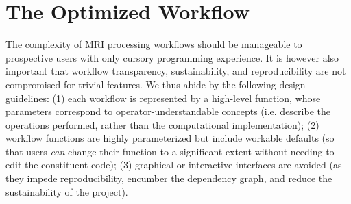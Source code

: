 \section{The Optimized Workflow}
The complexity of MRI processing workflows should be manageable to prospective users with only cursory programming experience.
It is however also important that workflow transparency, sustainability, and reproducibility are not compromised for trivial features.
We thus abide by the following design guidelines:
(1) each workflow is represented by a high-level function, whose parameters correspond to operator-understandable concepts (i.e. describe the operations performed, rather than the computational implementation);
(2) workflow functions are highly parameterized but include workable defaults (so that users \textit{can} change their function to a significant extent without needing to edit the constituent code);
(3) graphical or interactive interfaces are avoided (as they impede reproducibility, encumber the dependency graph, and reduce the sustainability of the project).

